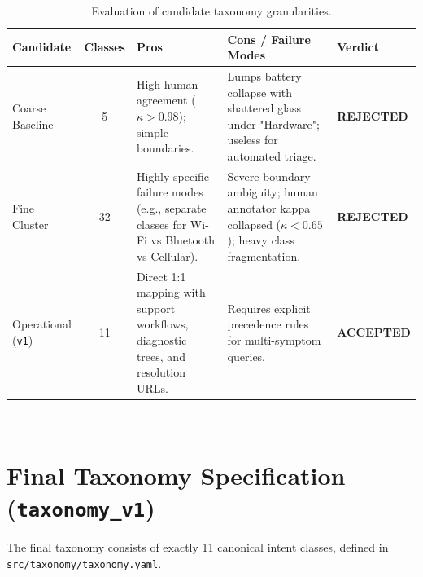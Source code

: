 \documentclass[11pt,a4paper]{article}
\begin{document}
\begin{table}[ht]
\centering
\small
\begin{tabularx}{\textwidth}{lcp{4.5cm}Xl}
\toprule
\textbf{Candidate} & \textbf{Classes} & \textbf{Pros} & \textbf{Cons / Failure Modes} & \textbf{Verdict} \\
\midrule
Coarse Baseline & 5 & High human agreement ($\kappa > 0.98$); simple boundaries. & Lumps battery collapse with shattered glass under "Hardware"; useless for automated triage. & \textbf{REJECTED} \\
Fine Cluster & 32 & Highly specific failure modes (e.g., separate classes for Wi-Fi vs Bluetooth vs Cellular). & Severe boundary ambiguity; human annotator kappa collapsed ($\kappa < 0.65$); heavy class fragmentation. & \textbf{REJECTED} \\
Operational (\texttt{v1}) & 11 & Direct 1:1 mapping with support workflows, diagnostic trees, and resolution URLs. & Requires explicit precedence rules for multi-symptom queries. & \textbf{ACCEPTED} \\
\bottomrule
\end{tabularx}
\caption{Evaluation of candidate taxonomy granularities.}
\label{tab:candidate_taxonomies}
\end{table}

---

\section{Final Taxonomy Specification (\texttt{taxonomy\_v1})}

The final taxonomy consists of exactly 11 canonical intent classes, defined in \texttt{src/taxonomy/taxonomy.yaml}.
\end{document}
